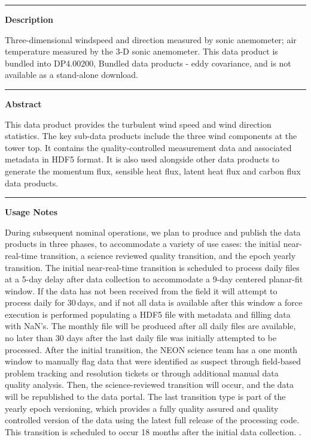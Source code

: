 \documentclass[]{article}
\begin{document}
\begin{center}\rule{0.5\linewidth}{\linethickness}\end{center}

\textbf{Description}

Three-dimensional windspeed and direction measured by sonic anemometer;
air temperature measured by the 3-D sonic anemometer. This data product
is bundled into DP4.00200, Bundled data products - eddy covariance, and
is not available as a stand-alone download.

\begin{center}\rule{0.5\linewidth}{\linethickness}\end{center}

\textbf{Abstract}

This data product provides the turbulent wind speed and wind direction
statistics. The key sub-data products include the three wind components
at the tower top. It contains the quality-controlled measurement data
and associated metadata in HDF5 format. It is also used alongside other
data products to generate the momentum flux, sensible heat flux, latent
heat flux and carbon flux data products.

\begin{center}\rule{0.5\linewidth}{\linethickness}\end{center}

\textbf{Usage Notes}

During subsequent nominal operations, we plan to produce and publish the
data products in three phases, to accommodate a variety of use cases:
the initial near-real-time transition, a science reviewed quality
transition, and the epoch yearly transition. The initial near-real-time
transition is scheduled to process daily files at a 5-day delay after
data collection to accommodate a 9-day centered planar-fit window. If
the data has not been received from the field it will attempt to process
daily for 30\,days, and if not all data is available after this window a
force execution is performed populating a HDF5 file with metadata and
filling data with NaN's. The monthly file will be produced after all
daily files are available, no later than 30 days after the last daily
file was initially attempted to be processed. After the initial
transition, the NEON science team has a one month window to manually
flag data that were identified as suspect through field-based problem
tracking and resolution tickets or through additional manual data
quality analysis. Then, the science-reviewed transition will occur, and
the data will be republished to the data portal. The last transition
type is part of the yearly epoch versioning, which provides a fully
quality assured and quality controlled version of the data using the
latest full release of the processing code. This transition is scheduled
to occur 18 months after the initial data collection. \newpage
.
\end{document}
